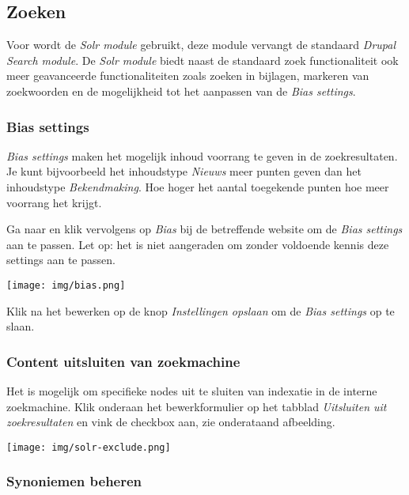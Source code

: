 
\subsection{Zoeken}\label{zoeken}

Voor \drupalpath wordt de \emph{Solr module} gebruikt, deze module vervangt de standaard \emph{Drupal Search module}. 
De \emph{Solr module} biedt naast de standaard zoek functionaliteit ook meer geavanceerde functionaliteiten zoals zoeken in bijlagen, markeren van zoekwoorden en de mogelijkheid tot het aanpassen van de \emph{Bias settings}. 

\subsubsection{Bias settings}

\emph{Bias settings} maken het mogelijk inhoud voorrang te geven in de zoekresultaten. Je kunt bijvoorbeeld het inhoudstype \emph{Nieuws} meer punten geven dan het inhoudstype \emph{Bekendmaking}. Hoe hoger het aantal toegekende punten hoe meer voorrang het krijgt. 

Ga naar  en klik vervolgens op \emph{Bias} bij de betreffende website om de \emph{Bias settings} aan te passen. Let op: het is niet aangeraden om zonder voldoende kennis deze settings aan te passen.

\begin{center}
	\texttt{[image: img/bias.png]}
\end{center}

Klik na het bewerken op de knop \emph{Instellingen opslaan} om de \emph{Bias settings} op te slaan. 

\subsubsection{Content uitsluiten van zoekmachine}

Het is mogelijk om specifieke nodes uit te sluiten van indexatie in de interne zoekmachine. Klik onderaan het bewerkformulier op het tabblad \emph{Uitsluiten uit zoekresultaten} en vink de checkbox aan, zie onderataand afbeelding.

\begin{center}
	\texttt{[image: img/solr-exclude.png]}
\end{center}

\subsubsection{Synoniemen beheren}

